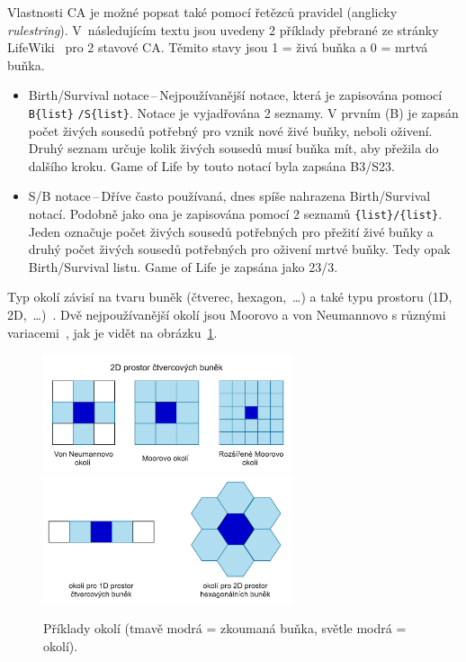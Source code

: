 Vlastnosti CA je možné popsat také pomocí řetězců pravidel (anglicky \textit{rulestring}). V~následujícím textu jsou uvedeny 2 příklady přebrané ze stránky LifeWiki~\cite{LifeWiki} pro 2 stavové CA. Těmito stavy jsou 1 = živá buňka a 0 = mrtvá buňka. 
\begin{itemize}
    \item Birth/Survival notace\,--\,Nejpoužívanější notace, která je zapisována pomocí \verb|B{list}| \verb|/S{list}|. Notace je vyjadřována 2 seznamy. V prvním (B) je zapsán počet živých sousedů potřebný pro vznik nové živé buňky, neboli oživení. Druhý seznam určuje kolik živých sousedů musí buňka mít, aby přežila do dalšího kroku. Game of Life by touto notací byla zapsána B3/S23.
    \item S/B notace\,--\,Dříve často používaná, dnes spíše nahrazena Birth/Survival notací. Podobně jako ona je zapisována pomocí 2 seznamů \verb|{list}|\verb|/{list}|. Jeden označuje počet živých sousedů potřebných pro přežití živé buňky a druhý počet živých sousedů potřebných pro oživení mrtvé buňky. Tedy opak Birth/Survival listu. Game of Life je zapsána jako 23/3.
\end{itemize}

Typ okolí závisí na tvaru buněk (čtverec, hexagon,~\ldots) a také typu prostoru (1D, 2D,~\ldots)~\cite{ims}. Dvě nejpoužívanější okolí jsou Moorovo a von Neumannovo s různými variacemi~\cite{sloot2004cellular}, jak je vidět na obrázku~\ref{fig:2D-okoli}.
\begin{figure}[H]
    \centering
    \includegraphics[width=0.65\textwidth]{obrazky-figures/ch2/2D-okoli.png}\hspace{0.5cm}
    \includegraphics[width=0.65\textwidth]{obrazky-figures/ch2/jina-okoli.png}
    \caption{Příklady okolí (tmavě modrá = zkoumaná buňka, světle modrá = okolí).}
    \label{fig:2D-okoli}
\end{figure}

